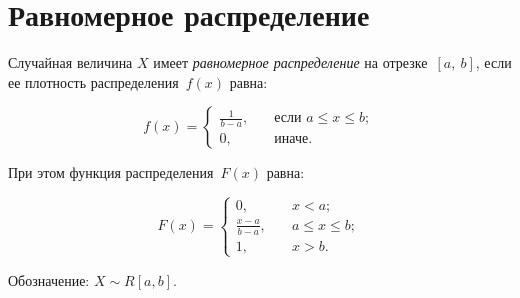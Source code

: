 \chapter{Равномерное распределение}

Случайная величина $X$ имеет \textit{равномерное распределение} на отрезке~$[a,~b]$, если ее плотность распределения~$f(x)$ равна:

\begin{equation}
	f(x) =
	\begin{cases}
		\displaystyle\frac{1}{b - a}, & \quad \text{если } a \leq x \leq b;\\
		0,  & \quad \text{иначе}.
	\end{cases}
\end{equation}

При этом функция распределения~$F(x)$ равна:

\begin{equation}
	F(x) =
	\begin{cases}
		0,  & \quad x < a;\\
		\displaystyle\frac{x - a}{b - a}, & \quad a \leq x \leq b;\\
		1,  & \quad x > b.
	\end{cases}
\end{equation}

Обозначение: $X \sim R[a, b]$.